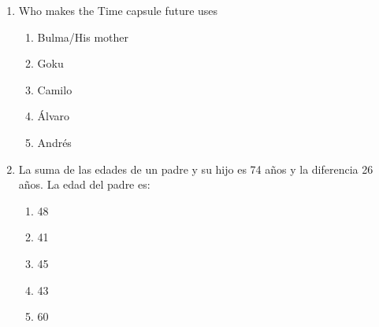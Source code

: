 \documentclass[letterpaper,addpoints,answers,twocolumn,10pt]{exam}
\begin{document}
\begin{enumerate}[leftmargin=.2in]
\begin{enumerate}[noitemsep,leftmargin=0in]
\end{enumerate}



\item  Who makes the Time capsule future uses


\begin{enumerate}[noitemsep,leftmargin=0in]


\item  Bulma/His mother
\item  Goku
\item  Camilo
\item  Álvaro
\item  Andrés


\end{enumerate}



\item  La suma de las edades de un padre y su hijo es 74 años y la diferencia 26 años. La edad del padre es:


\begin{enumerate}[noitemsep,leftmargin=0in]


\item  48
\item  41
\item  45
\item  43
\item  60


\end{enumerate}



\end{enumerate}
\end{document}
